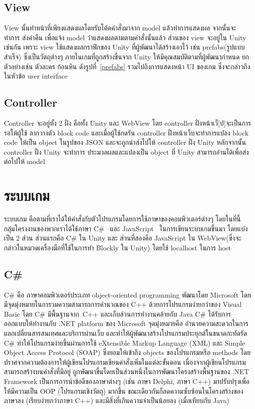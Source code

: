  \subsection{View}
 View นั้นทำหน้าที่เพียงแสดงผลโดยรับโค้ดคำสั่งมาจาก model แล้วทำการแสดงผล จากนั้นจะทำการ
 ส่งค่าคืน เพื่อแจ้ง model ว่าแสดงผลตามตามคำสั่งนั้นแล้ว ส่วนของ view จะอยู่ใน
 Unity เช่นกัน เพราะ view ใช้แสดงผลกราฟิกของ Unity ที่ผู้พัฒนาได้สร้างเอาไว้ เช่น prefabs(รูปแบบสำเร็จ) 
 ซึ่งเป็นวัตถุต่างๆ ภายในเกมที่ถูกสร้างขึ้นจาก Unity ให้มีคุณสมบัติตามที่ผู้พัฒนากำหนด ยกตัวอย่างเช่น ตัวละคร ก้อนหิน ดังรูปที่~\ref{prefabs}
 รวมไปถึงการแสดงหน้า UI ของเกม ซึ่งจะกล่าวถึงในหัวข้อ user interface
    

\subsection{Controller}
Controller จะอยู่ทั้ง 2 ฝั่ง คือทั้ง Unity และ WebView โดย controller ฝั่งหน้าเว็[ป]จะเป็นการรอให้ผู้ใช้
ลากวางตัว block code และเมื่อผู้ใช้กดรัน controller ฝั่งหน้าเว็บจะทำการแปลง block code ให้เป็น object 
ในรูปของ JSON และจะถูกนำส่งไปให้ controller ฝั่ง Unity หลักจากนั้น controller ฝั่ง Unity จะทำการ
ประมวลผลและแปลงเป็น object ที่ Unity สามารถอ่านได้เพื่อส่งต่อไปให้ model


\section{ระบบเกม}
ระบบเกม คือตามที่เราได้ให้คำสั่งกับตัวโปรแกรมโดยการใช้ภาษาของคอมพิวเตอร์ต่างๆ 
โดยในที่นี้ กลุ่มโครงงานของพวกเราได้ใช้ภาษา C\#~\cite{cs} และ JavaScript~\cite{js}
ในการเขียนระบบเกมขึ้นมา โดยแบ่งเป็น 2 ส่วน ส่วนแรกคือ C\# ใน Unity 
และ ส่วนที่สองคือ JavaScript ใน WebView(ซึ่งจะกล่าวในหมวดเครื่องมือที่ใช้ในการทำ Blockly ใน Unity) โดยใช้ localhost ในการ host

\subsection{C\#}
C\# คือ ภาษาคอมพิวเตอร์ประเภท object-oriented programming พัฒนาโดย Microsoft โดยมีจุดมุ่งหมายในการวมความสามารถการคำนวณของ 
C++ ด้วยการโปรแกรมง่ายกว่าของ Visual Basic โดย C\# มีพื้นฐานจาก 
C++ และเก็บส่วนการทำงานคล้ายกับ Java 
C\# ได้รับการออกแบบให้ทำงานกับ .NET platform ของ Microsoft
จุดมุ่งหมายคือ อำนวยความสะดวกในการแลกเปลี่ยนสารสนเทศและบริการผ่านเว็บ 
และทำให้ผู้พัฒนาสร้างโปรแกรมประยุกต์ในขนาดกะทัดรัด C\# 
ทำให้โปรแกรมง่ายขึ้นผ่านการใช้ eXtensible Markup Language (XML) 
และ Simple Object Access Protocol (SOAP) 
ซึ่งยอมให้เข้าถึง objects ของโปรแกรมหรือ methods 
โดยปราศจากความต้องการให้ผู้เขียนโปรแกรมเขียนคำสั่งเพิ่มในแต่ละขั้นตอน 
เนื่องจากผู้เขียนโปรแกรมสามารถสร้างบนคำสั่งที่มีอยู่ 
 ถูกพัฒนาขึ้นโดยเป็นส่วนหนึ่งในการพัฒนาโครงสร้างพื้นฐานของ
.NET Framework เป็นการการนำข้อดีของภาษาต่างๆ 
(เช่น ภาษา Delphi, ภาษา C++) มาปรับปรุงเพื่อให้มีความเป็น OOP 
(โปรแกรมเชิงวัตถุ) มากขึ้น ขณะเดียวกันก็ลดความซับซ้อนในโครงสร้างของภาษาลง (เรียบง่ายกว่าภาษา C++) 
และมีสิ่งที่เกินความจำเป็นน้อยลง (เมื่อเทียบกับ Java)~\cite{cs}

